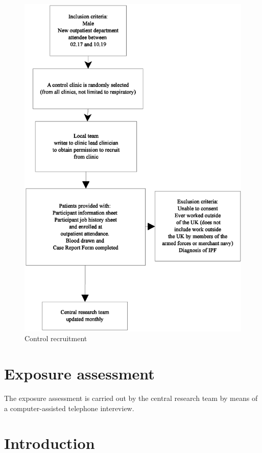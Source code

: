 \documentclass[a4paper,10pt]{article}
\begin{document}
\begin{figure}
\includegraphics[scale=0.8]{fig/control-recruitment.eps}
\caption{Control recruitment\label{fig:contrec}}
\end{figure}

\section{Exposure assessment}

The exposure assessment is carried out by the central research team by means of a computer-assisted telephone intereview.

\section{Introduction}
\end{document}
